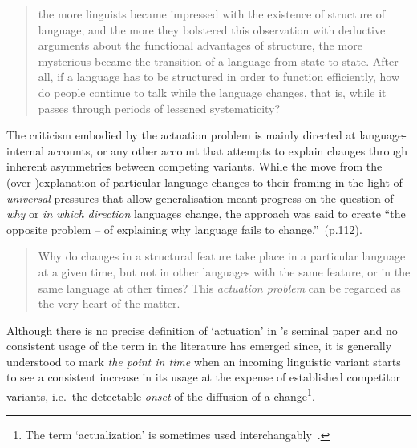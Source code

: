 \begin{quote}
the more linguists became impressed with the existence of structure of language, and the more they bolstered this observation with deductive arguments about the functional advantages of structure, the more mysterious became the transition of a language from state to state. After all, if a language has to be structured in order to function efficiently, how do people continue to talk while the language changes, that is, while it passes through periods of lessened systematicity?~\citep[p.100]{Weinreich1968}
\end{quote}

The criticism embodied by the actuation problem is mainly directed at language-internal accounts, or any other account that attempts to explain changes through inherent asymmetries between competing variants.
While the move from the (over-)explanation of particular language changes to their framing in the light of \emph{universal} pressures that allow generalisation meant progress on the question of \emph{why} or \emph{in which direction} languages change, the approach was said to create ``the opposite problem -- of explaining why language fails to change.''~(p.112).

\begin{quote}
Why do changes in a structural feature take place in a particular language at a given time, but not in other languages with the same feature, or in the same language at other times? This \emph{actuation problem} can be regarded as the very heart of the matter.~\citep[p.102]{Weinreich1968}
\end{quote}

Although there is no precise definition of `actuation' in \citeauthor{Weinreich1968}'s seminal paper and no consistent usage of the term in the literature has emerged since, it is generally understood to mark \emph{the point in time} when an incoming linguistic variant starts to see a consistent increase in its usage at the expense of established competitor variants, i.e.~the detectable \emph{onset} of the diffusion of a change\footnote{The term `actualization' \citep[with a specific meaning in grammaticalisation theory, see][p.24]{Traugott2011} is sometimes used interchangably~\citep{Andersen2008,Kiparsky2014}.}.



